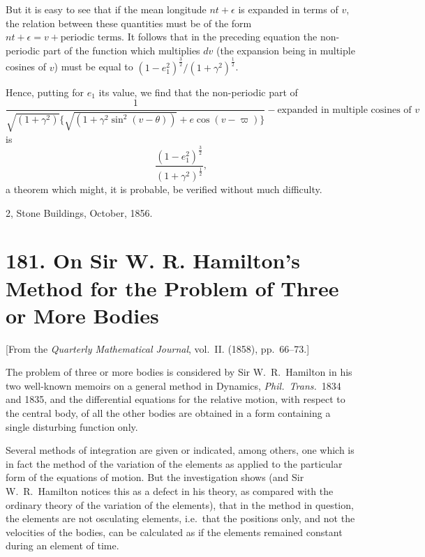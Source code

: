 \documentclass[11pt,a4paper]{book}
\begin{document}
But it is easy to see that if the mean longitude $nt + \epsilon$ is expanded in terms of $v$, the relation between these quantities must be of the form $nt + \epsilon = v + \text{periodic terms}$. It follows that in the preceding equation the non-periodic part of the function which multiplies $dv$ (the expansion being in multiple cosines of $v$) must be equal to $(1 - e_1^2)^{\frac{3}{2}} / (1 + \gamma^2)^{\frac{1}{2}}$.

Hence, putting for $e_1$ its value, we find that the non-periodic part of
\[
\frac{1}{\sqrt{(1 + \gamma^2)} \{\sqrt{(1 + \gamma^2 \sin^2(v - \theta))} + e \cos(v - \varpi)\}} - \text{expanded in multiple cosines of } v
\]
is
\[
\frac{(1 - e_1^2)^{\frac{3}{2}}}{(1 + \gamma^2)^{\frac{1}{2}}},
\]
a theorem which might, it is probable, be verified without much difficulty.

\begin{flushright}
2, Stone Buildings, October, 1856.
\end{flushright}


\newpage
\section*{181. On Sir W. R. Hamilton's Method for the Problem of Three or More Bodies}

[From the \textit{Quarterly Mathematical Journal}, vol.~II. (1858), pp.~66--73.]

The problem of three or more bodies is considered by Sir W.~R.~Hamilton in his two well-known memoirs on a general method in Dynamics, \textit{Phil.\ Trans.}\ 1834 and 1835, and the differential equations for the relative motion, with respect to the central body, of all the other bodies are obtained in a form containing a single disturbing function only.

Several methods of integration are given or indicated, among others, one which is in fact the method of the variation of the elements as applied to the particular form of the equations of motion. But the investigation shows (and Sir W.~R.~Hamilton notices this as a defect in his theory, as compared with the ordinary theory of the variation of the elements), that in the method in question, the elements are not osculating elements, i.e.\ that the positions only, and not the velocities of the bodies, can be calculated as if the elements remained constant during an element of time.
\end{document}
